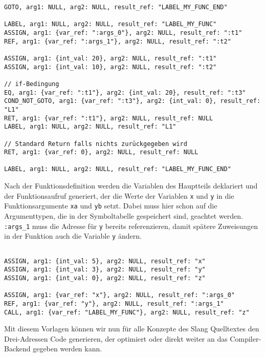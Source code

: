 \begin{lstlisting}[caption={Drei-Adressen Code Funktionsdeklaration}]
GOTO, arg1: NULL, arg2: NULL, result_ref: "LABEL_MY_FUNC_END"

LABEL, arg1: NULL, arg2: NULL, result_ref: "LABEL_MY_FUNC"
ASSIGN, arg1: {var_ref: ":args_0"}, arg2: NULL, result_ref: ":t1"
REF, arg1: {var_ref: ":args_1"}, arg2: NULL, result_ref: ":t2"

ASSIGN, arg1: {int_val: 20}, arg2: NULL, result_ref: ":t1"
ASSIGN, arg1: {int_val: 10}, arg2: NULL, result_ref: ":t2"

// if-Bedingung
EQ, arg1: {var_ref: ":t1"}, arg2: {int_val: 20}, result_ref: ":t3"
COND_NOT_GOTO, arg1: {var_ref: ":t3"}, arg2: {int_val: 0}, result_ref: "L1"
RET, arg1: {var_ref: ":t1"}, arg2: NULL, result_ref: NULL
LABEL, arg1: NULL, arg2: NULL, result_ref: "L1"

// Standard Return falls nichts zurückgegeben wird
RET, arg1: {var_ref: 0}, arg2: NULL, result_ref: NULL

LABEL, arg1: NULL, arg2: NULL, result_ref: "LABEL_MY_FUNC_END"
\end{lstlisting}

Nach der Funktionsdefinition werden die Variablen des Hauptteils deklariert und der Funktionsaufruf generiert, der die Werte der Variablen \texttt{x} und \texttt{y} in die Funktionsargumente \texttt{xa} und \texttt{yb} setzt.
Dabei muss hier schon auf die Argumenttypen, die in der Symboltabelle gespeichert sind, geachtet werden.
\texttt{:args\_1} muss die Adresse für \texttt{y} bereits referenzieren, damit spätere Zuweisungen in der Funktion auch die Variable \texttt{y} ändern.\\

\begin{lstlisting}[caption={Drei-Adressen Code Funktionsaufruf}]

ASSIGN, arg1: {int_val: 5}, arg2: NULL, result_ref: "x"
ASSIGN, arg1: {int_val: 3}, arg2: NULL, result_ref: "y"
ASSIGN, arg1: {int_val: 0}, arg2: NULL, result_ref: "z"

ASSIGN, arg1: {var_ref: "x"}, arg2: NULL, result_ref: ":args_0"
REF, arg1: {var_ref: "y"}, arg2: NULL, result_ref: ":args_1"
CALL, arg1: {var_ref: "LABEL_MY_FUNC"}, arg2: NULL, result_ref: "z"

\end{lstlisting}

Mit diesem Vorlagen können wir nun für alle Konzepte des Slang Quelltextes den Drei-Adressen Code generieren, der optimiert oder direkt weiter an das Compiler-Backend gegeben werden kann.
